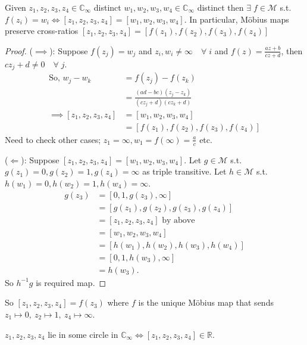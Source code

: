 \begin{theorem} \label{thm:19}
    Given $z_1, z_2, z_3, z_4 \in \mathbb{C}_\infty$ distinct $w_1, w_2, w_3, w_4 \in \mathbb{C}_\infty$ distinct then $\exists \; f \in \mathcal{M}$ s.t. $f(z_i) = w_i \iff [z_1, z_2, z_3, z_4] = [w_1, w_2, w_3, w_4]$.
    In particular, M\"obius maps preserve cross-ratios $[z_1, z_2, z_3, z_4] = [f(z_1), f(z_2), f(z_3), f(z_4)]$
\end{theorem} 

\begin{proof} \mbox{}
    ($\implies$): Suppose $f(z_j) = w_j$ and $z_i, w_i \neq \infty \quad \forall \; i$ and $f(z) = \frac{az + b}{cz + d}$, then $cz_j + d \neq 0 \quad \forall \; j$.
    \begin{align*}
        \text{So, } w_j - w_k &= f(z_j) - f(z_k) \\
        &= \frac{(ad - bc) (z_j - z_k)}{(c z_j + d) (c z_k + d)} \\
        \implies [z_1, z_2, z_3, z_4] &= [w_1, w_2, w_3, w_4] \\
        &=  [f(z_1), f(z_2), f(z_3), f(z_4)]
    \end{align*} 
    Need to check other cases; $z_1 = \infty, w_1 = f(\infty) = \frac{a}{c}$ etc.

    ($\Longleftarrow$): Suppose $[z_1, z_2, z_3, z_4] = [w_1, w_2, w_3, w_4]$.
    Let $g \in \mathcal{M}$ s.t. $g(z_1) = 0, g(z_2) = 1, g(z_4) = \infty$ as triple transitive.
    Let $h \in \mathcal{M}$ s.t. $h(w_1) = 0, h(w_2) = 1, h(w_4) = \infty$.
    \begin{align*}
        g(z_3) &= [0, 1, g(z_3), \infty] \\
        &= [g(z_1), g(z_2), g(z_3), g(z_4)] \\
        &= [z_1, z_2, z_3, z_4] \text{ by above} \\
        &= [w_1, w_2, w_3, w_4] \\
        &= [h(w_1), h(w_2), h(w_3), h(w_4)] \\
        &= [0, 1, h(w_3), \infty] \\
        &= h(w_3).
    \end{align*} 
    So $h^{-1}g$ is required map. 
\end{proof} 

So $[z_1, z_2, z_3, z_4] = f(z_3)$ where $f$ is the unique M\"obius map that sends $z_1 \mapsto 0,\ z_2 \mapsto 1,\ z_4 \mapsto \infty$.

\begin{corollary} \label{cor:9}
    $z_1, z_2, z_3, z_4$ lie in some circle in $\mathbb{C}_\infty \iff [z_1, z_2, z_3, z_4] \in \mathbb{R}$.
\end{corollary} 

